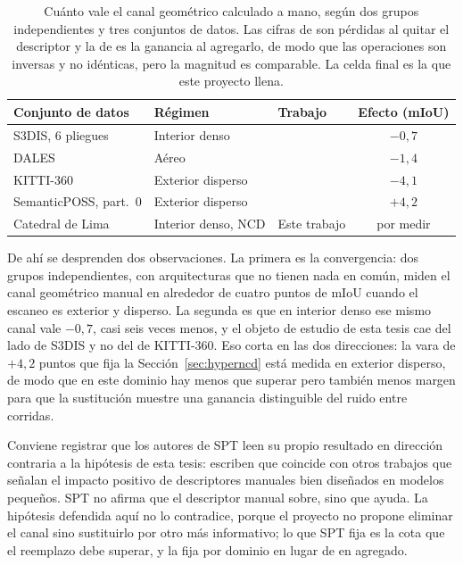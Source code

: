 \begin{table}[htbp]
\centering
\caption{Cuánto vale el canal geométrico calculado a mano, según dos grupos
independientes y tres conjuntos de datos. Las cifras de \cite{robert2023spt} son
pérdidas al quitar el descriptor y la de \cite{zhang2026hyperncd} es la ganancia
al agregarlo, de modo que las operaciones son inversas y no idénticas, pero la
magnitud es comparable. La celda final es la que este proyecto llena.}
\label{tab:canal-geo}
\begin{tabular}{@{}p{3.2cm}p{3.8cm}p{2.2cm}c@{}}
\hline
Conjunto de datos & Régimen & Trabajo & Efecto (mIoU) \\
\hline
S3DIS, 6 pliegues & Interior denso & \cite{robert2023spt} & $-0{,}7$ \\
DALES & Aéreo & \cite{robert2023spt} & $-1{,}4$ \\
KITTI-360 & Exterior disperso & \cite{robert2023spt} & $-4{,}1$ \\
SemanticPOSS, part.~0 & Exterior disperso & \cite{zhang2026hyperncd} & $+4{,}2$ \\
Catedral de Lima & Interior denso, NCD & Este trabajo & por medir \\
\hline
\end{tabular}
\end{table}

De ahí se desprenden dos observaciones. La primera es la convergencia: dos grupos
independientes, con arquitecturas que no tienen nada en común, miden el canal
geométrico manual en alrededor de cuatro puntos de mIoU cuando el escaneo es
exterior y disperso. La segunda es que en interior denso ese mismo canal vale
$-0{,}7$, casi seis veces menos, y el objeto de estudio de esta tesis cae del
lado de S3DIS y no del de KITTI-360. Eso corta en las dos direcciones: la vara de
$+4{,}2$ puntos que fija la Sección~\ref{sec:hyperncd} está medida en exterior
disperso, de modo que en este dominio hay menos que superar pero también menos
margen para que la sustitución muestre una ganancia distinguible del ruido entre
corridas.

Conviene registrar que los autores de SPT leen su propio resultado en dirección
contraria a la hipótesis de esta tesis: escriben que coincide con otros trabajos
que señalan el impacto positivo de descriptores manuales bien diseñados en
modelos pequeños. SPT no afirma que el descriptor manual sobre, sino que ayuda.
La hipótesis defendida aquí no lo contradice, porque el proyecto no propone
eliminar el canal sino sustituirlo por otro más informativo; lo que SPT fija es
la cota que el reemplazo debe superar, y la fija por dominio en lugar de en
agregado.

